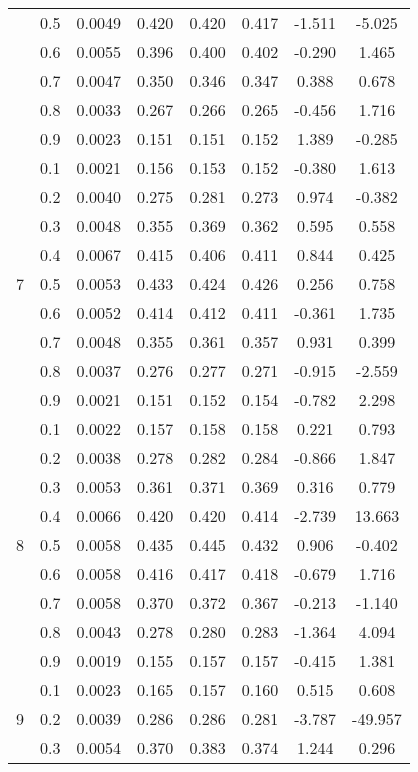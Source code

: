 \documentclass[11pt,a4paper]{report}
\begin{document}
\begin{longtable}{ | c | c || c | c | c | c | c | c | }
 & 0.5 & 0.0049 & 0.420 & 0.420 & 0.417 & -1.511 & -5.025 \\
 & 0.6 & 0.0055 & 0.396 & 0.400 & 0.402 & -0.290 & 1.465 \\
 & 0.7 & 0.0047 & 0.350 & 0.346 & 0.347 & 0.388 & 0.678 \\
 & 0.8 & 0.0033 & 0.267 & 0.266 & 0.265 & -0.456 & 1.716 \\
 & 0.9 & 0.0023 & 0.151 & 0.151 & 0.152 & 1.389 & -0.285 \\
 \hline
\multirow{9}{*}{7} & 0.1 & 0.0021 & 0.156 & 0.153 & 0.152 & -0.380 & 1.613 \\
 & 0.2 & 0.0040 & 0.275 & 0.281 & 0.273 & 0.974 & -0.382 \\
 & 0.3 & 0.0048 & 0.355 & 0.369 & 0.362 & 0.595 & 0.558 \\
 & 0.4 & 0.0067 & 0.415 & 0.406 & 0.411 & 0.844 & 0.425 \\
 & 0.5 & 0.0053 & 0.433 & 0.424 & 0.426 & 0.256 & 0.758 \\
 & 0.6 & 0.0052 & 0.414 & 0.412 & 0.411 & -0.361 & 1.735 \\
 & 0.7 & 0.0048 & 0.355 & 0.361 & 0.357 & 0.931 & 0.399 \\
 & 0.8 & 0.0037 & 0.276 & 0.277 & 0.271 & -0.915 & -2.559 \\
 & 0.9 & 0.0021 & 0.151 & 0.152 & 0.154 & -0.782 & 2.298 \\
 \hline
\multirow{9}{*}{8} & 0.1 & 0.0022 & 0.157 & 0.158 & 0.158 & 0.221 & 0.793 \\
 & 0.2 & 0.0038 & 0.278 & 0.282 & 0.284 & -0.866 & 1.847 \\
 & 0.3 & 0.0053 & 0.361 & 0.371 & 0.369 & 0.316 & 0.779 \\
 & 0.4 & 0.0066 & 0.420 & 0.420 & 0.414 & -2.739 & 13.663 \\
 & 0.5 & 0.0058 & 0.435 & 0.445 & 0.432 & 0.906 & -0.402 \\
 & 0.6 & 0.0058 & 0.416 & 0.417 & 0.418 & -0.679 & 1.716 \\
 & 0.7 & 0.0058 & 0.370 & 0.372 & 0.367 & -0.213 & -1.140 \\
 & 0.8 & 0.0043 & 0.278 & 0.280 & 0.283 & -1.364 & 4.094 \\
 & 0.9 & 0.0019 & 0.155 & 0.157 & 0.157 & -0.415 & 1.381 \\
 \hline
\multirow{9}{*}{9} & 0.1 & 0.0023 & 0.165 & 0.157 & 0.160 & 0.515 & 0.608 \\
 & 0.2 & 0.0039 & 0.286 & 0.286 & 0.281 & -3.787 & -49.957 \\
 & 0.3 & 0.0054 & 0.370 & 0.383 & 0.374 & 1.244 & 0.296 \\

\end{longtable}
\end{document}
